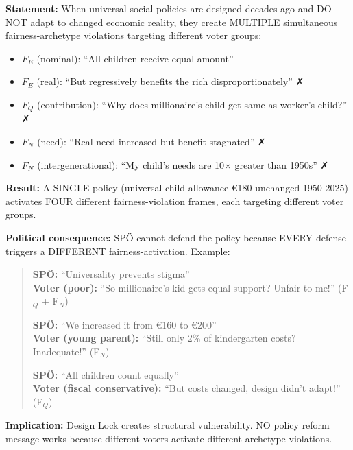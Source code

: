 \begin{tcolorbox}[colback=gray!5!white, colframe=gray!75!black,
    title=Axiom UNMAPPED_CM-9: Intra-Archetype Conflicts Under Design Lock]

\textbf{Statement:} When universal social policies are designed decades ago and DO NOT adapt
to changed economic reality, they create MULTIPLE simultaneous fairness-archetype violations
targeting different voter groups:

\begin{itemize}[nosep]
\item $F_E$ (nominal): ``All children receive equal amount''
\item $F_E$ (real): ``But regressively benefits the rich disproportionately'' ✗
\item $F_Q$ (contribution): ``Why does millionaire's child get same as worker's child?'' ✗
\item $F_N$ (need): ``Real need increased but benefit stagnated'' ✗
\item $F_N$ (intergenerational): ``My child's needs are 10× greater than 1950s'' ✗
\end{itemize}

\textbf{Result:} A SINGLE policy (universal child allowance €180 unchanged 1950-2025)
activates FOUR different fairness-violation frames, each targeting different voter groups.

\textbf{Political consequence:} SPÖ cannot defend the policy because EVERY defense triggers
a DIFFERENT fairness-activation. Example:

\begin{quote}
\textbf{SPÖ:} ``Universality prevents stigma''
\\
\textbf{Voter (poor):} ``So millionaire's kid gets equal support? Unfair to me!'' (F$_Q$ + F$_N$)

\vspace{0.3em}

\textbf{SPÖ:} ``We increased it from €160 to €200''
\\
\textbf{Voter (young parent):} ``Still only 2\% of kindergarten costs? Inadequate!'' (F$_N$)

\vspace{0.3em}

\textbf{SPÖ:} ``All children count equally''
\\
\textbf{Voter (fiscal conservative):} ``But costs changed, design didn't adapt!'' (F$_Q$)
\end{quote}

\textbf{Implication:} Design Lock creates structural vulnerability. NO policy reform message
works because different voters activate different archetype-violations.

\end{tcolorbox}

